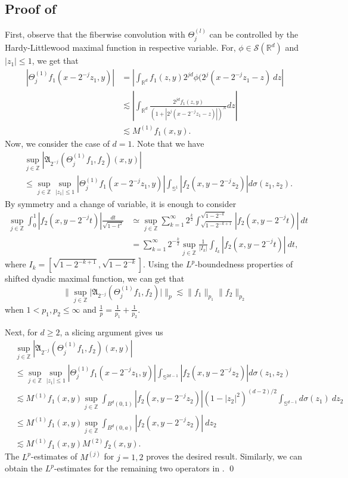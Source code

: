 \documentclass[a4paper,reqno]{amsart}
\theoremstyle{definition}
\theoremstyle{remark}
\numberwithin{equation}{section}
\newcommand{\R}{{\mathbb {R}}}
\begin{document}
	\subsection*{Proof of }	First, observe that the fiberwise convolution with $\Theta_j^{(l)}$ can be controlled by the Hardy-Littlewood maximal function in respective variable. For, $\phi\in\mathscr S(\R^d)$ and $|z_1|\leq 1$, we get that
	\begin{align*}		|\Theta_j^{(1)}f_1(x-2^{-j}z_1,y)|
		&=\left|\int_{\R^d} f_1(z,y)2^{jd}\phi(2^{j}(x-2^{-j}z_1-z)~dz\right|\\
		&\lesssim \left|\int_{\R^d} \frac{2^{jd}f_1(z,y)}{(1+|2^{j}(x-2^{-j}z_1-z)|)^{N}}dz\right|\\
		&\lesssim  M^{(1)}f_1(x,y).
	\end{align*}
	Now, we consider the case of $d=1$. Note that we have
	\begin{align*}
		&\sup_{j\in\mathbb{Z}}\left|\mathfrak{A}_{2^{-j}}(\Theta_j^{(1)}f_1,f_2)(x,y)\right|\\&\leq\sup_{j\in\mathbb{Z}}\sup_{|z_1|\leq1}|\Theta_j^{(1)}f_1(x-2^{-j}z_1,y)|\int_{\mathbb{S}^{1}}|f_2(x,y-2^{-j}z_2)|d\sigma(z_1,z_2).
	\end{align*}
	By symmetry and a change of variable, it is enough to consider
	\begin{align*}
		\sup_{j\in\mathbb{Z}}\int_0^1|f_2(x,y-2^{-j}t)|\frac{dt}{\sqrt{1-t^2}}&\simeq\sup_{j\in\mathbb{Z}}\sum_{k=1}^\infty2^\frac{k}{2}\int_{\sqrt{1-2^{-k+1}}}^{\sqrt{1-2^{-k}}}|f_2(x,y-2^{-j}t)|~dt\\
		&=\sum_{k=1}^\infty2^{-\frac{k}{2}}\sup_{j\in\mathbb{Z}}\frac{1}{|I_k|}\int_{I_k}|f_2(x,y-2^{-j}t)|~dt,
	\end{align*}
	where $I_k=[\sqrt{1-2^{-k+1}},\sqrt{1-2^{-k}}]$. Using the $L^p$-boundedness properties of shifted dyadic maximal function, we can get that
	\[\Big\|\sup_{j\in\mathbb{Z}}\Big|\mathfrak{A}_{2^{-j}}(\Theta_j^{(1)}f_1,f_2)\Big|\Big\|_p\lesssim\|f_1\|_{p_1}\|f_2\|_{p_2}\]
	when $1<p_1,p_2\leq\infty$ and $\frac{1}{p}=\frac{1}{p_1}+\frac{1}{p_2}$.
	
	Next, for $d\geq2$, a slicing argument gives us
	\begin{align*}
		&\sup_{j\in\mathbb{Z}}\left|\mathfrak{A}_{2^{-j}}(\Theta_j^{(1)}f_1,f_2)(x,y)\right|\\&\leq \sup_{j\in\mathbb{Z}}\sup_{|z_1|\leq1}|\Theta_j^{(1)}f_1(x-2^{-j}z_1,y)|\int_{\mathbb{S}^{2d-1}}|f_2(x,y-2^{-j}z_2)|d\sigma(z_1,z_2)\\
		&\lesssim M^{(1)}f_1(x,y)\sup_{j\in\mathbb{Z}}\int_{B^{d}(0,1)}|f_2(x,y-2^{-j}z_2)|(1-|z_2|^{2})^{(d-2)/2}\int_{\mathbb{S}^{d-1}}d\sigma(z_1)~dz_2\\
		&\leq M^{(1)}f_1(x,y)\sup_{j\in\mathbb{Z}}\int_{B^{d}(0,a)}|f_2(x,y-2^{-j}z_2)|~dz_2\\
		&\lesssim M^{(1)}f_1(x,y)M^{(2)}f_2(x,y).
	\end{align*}
	The $L^p$-estimates of $M^{(j)}$ for $j=1,2$ proves the desired result. Similarly, we can obtain the $L^p$-estimates for the remaining two operators in . \qed
	
\end{document}
